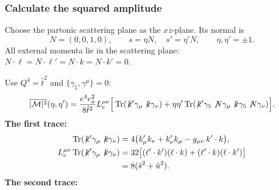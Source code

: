 \documentclass[14pt,a4paper]{extarticle}
\numberwithin{equation}{section}
\newcommand{\M}{\mathcal M}
\newcommand{\slsh}[1]{\not\!#1}
\begin{document}
\subsubsection{Calculate the squared amplitude}

Choose the partonic scattering plane as the $xz$-plane. Its normal is
\begin{equation}
 N=(0,0,1,0),\qquad s=\eta N,\quad s'=\eta'N,
 \qquad \eta,\eta'=\pm1.
\end{equation}
All external momenta lie in the scattering plane:
$N\cdot\ell=N\cdot\ell'=N\cdot k=N\cdot k'=0$.


Use $Q^4=\hat t^2$ and $\{\gamma_5,\gamma^\mu\}=0$:
\begin{align}
 \overline{|\M|^2}(\eta,\eta')
 =\frac{e^4e_a^2}{8\hat t^2}L_e^{\mu\nu}
 \Big[
 \operatorname{Tr}(\slsh{k'}\gamma_\mu\slsh k\gamma_\nu)
 \notag
 +\eta\eta'\operatorname{Tr}
 (\slsh{k'}\gamma_5\slsh N\gamma_\mu
  \slsh k\gamma_5\slsh N\gamma_\nu)\Big].
\end{align}
\textbf{The first trace: }
\begin{align}
 \operatorname{Tr}(\slsh{k'}\gamma_\mu\slsh k\gamma_\nu)
 &=4\bigl(k'_\mu k_\nu+k'_\nu k_\mu
          -g_{\mu\nu}\,k'\cdot k\bigr),\\
 L_e^{\mu\nu}
 \operatorname{Tr}(\slsh{k'}\gamma_\mu\slsh k\gamma_\nu)
 &=32\bigl[(\ell'\cdot k')(\ell\cdot k)
          +(\ell'\cdot k)(\ell\cdot k')\bigr]\notag\\
 &=8(\hat s^2+\hat u^2).
\end{align}
\textbf{The second trace:}
\end{document}
